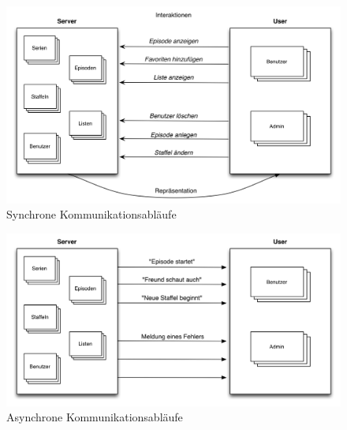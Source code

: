 \documentclass[a4paper]{article}
\begin{document}
\begin{figure}
\includegraphics[width=1\textwidth]{images/kommunikationsablaeufe.png}
\caption{Synchrone Kommunikationsabläufe}
\label{kommunikationsablaeufe}
\end{figure}


\begin{figure}
\includegraphics[width=1\textwidth]{images/kommunikationsablaeufeAsynchron.png}
\caption{Asynchrone Kommunikationsabläufe}
\label{kommunikationsablaeufeAsynchron}
\end{figure}
\end{document}
